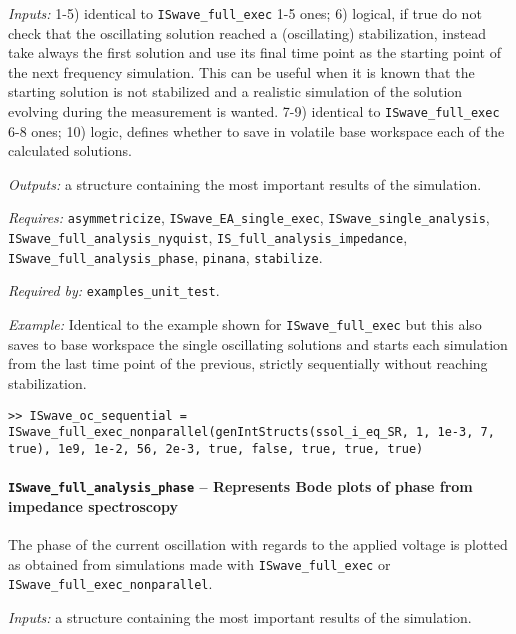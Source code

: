 	\textit{Inputs:} 1-5) identical to \texttt{IS\-wave\_full\_exec} 1-5 ones;
	6) logical, if true do not check that the oscillating solution reached a
	(oscillating) stabilization, instead take always the first solution
	and use its final time point as the starting point of the next
	frequency simulation. This can be useful when it is known that the
	starting solution is not stabilized and a realistic simulation of the
	solution evolving during the measurement is wanted.
	7-9) identical to \texttt{IS\-wave\_full\_exec} 6-8 ones;
	10) logic, defines whether to save in volatile base
	workspace each of the calculated solutions.

	\textit{Outputs:} a structure containing the most important results of the simulation.

	\textit{Requires:} \texttt{asymmetricize}, \texttt{IS\-wave\_EA\_single\_exec},
	\texttt{IS\-wave\_single\_analysis}, \texttt{IS\-wave\_full\_analysis\_nyquist},
	\texttt{IS\_full\_analysis\_impedance}, \texttt{IS\-wave\_full\_analysis\_phase}, \texttt{pinana},
	\texttt{stabilize}.

	\textit{Required by:} \texttt{examples\_unit\_test}.

	\textit{Example:} Identical to the example shown for \texttt{IS\-wave\_full\_exec} but this also saves to base workspace the single oscillating solutions and starts each simulation from the last time point of the previous, strictly sequentially without reaching stabilization.
	\begin{lstlisting}[style=Matlab-editor]
>> ISwave_oc_sequential = ISwave_full_exec_nonparallel(genIntStructs(ssol_i_eq_SR, 1, 1e-3, 7, true), 1e9, 1e-2, 56, 2e-3, true, false, true, true, true)
\end{lstlisting}

	\paragraph{\texttt{IS\-wave\_full\_analysis\_phase} -- Represents Bode plots of phase from impedance spectroscopy}
	The phase of the current oscillation with regards to the applied voltage is plotted as obtained from simulations made with \texttt{IS\-wave\_full\_exec} or \texttt{IS\-wave\_full\_exec\_nonparallel}.


	\textit{Inputs:} a structure containing the most important results of the simulation.



